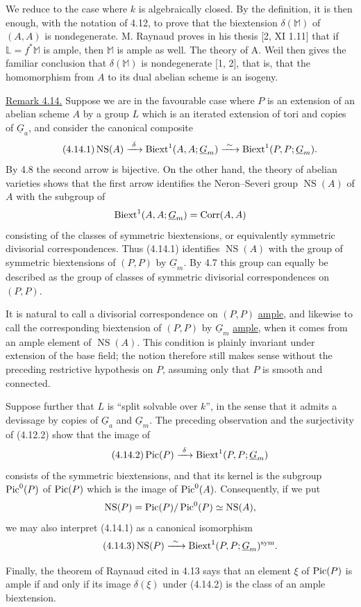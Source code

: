 We reduce to the case where $k$ is algebraically closed.  By the
definition, it is then enough, with the notation of 4.12, to prove
that the biextension $\delta(\mathbb M)$ of $(A,A)$ is
nondegenerate.  M. Raynaud proves in his thesis [2, XI 1.11] that if
$\mathbb L=f^*\mathbb M$ is ample, then $\mathbb M$ is ample as
well.  The theory of A. Weil then gives the familiar conclusion that
$\delta(\mathbb M)$ is nondegenerate [1, 2], that is, that the
homomorphism from $A$ to its dual abelian scheme is an isogeny.

\medskip
\noindent\underline{Remark 4.14.}  Suppose we are in the favourable
case where $P$ is an extension of an abelian scheme $A$ by a group
$L$ which is an iterated extension of tori and copies of
$\underline G_a$, and consider the canonical composite
\begin{equation}\tag{4.14.1}
 \operatorname{NS}(A)
 \xrightarrow{\ \delta\ }
 \Biext^1(A,A;\underline G_m)
 \xrightarrow{\ \sim\ }
 \Biext^1(P,P;\underline G_m).
\end{equation}
By 4.8 the second arrow is bijective.  On the other hand, the theory
of abelian varieties shows that the first arrow identifies the
Neron--Severi group $\operatorname{NS}(A)$ of $A$ with the subgroup
of
\[
 \Biext^1(A,A;\underline G_m)=\operatorname{Corr}(A,A)
\]
consisting of the classes of symmetric biextensions, or equivalently
symmetric divisorial correspondences.  Thus (4.14.1) identifies
$\operatorname{NS}(A)$ with the group of symmetric biextensions of
$(P,P)$ by $\underline G_m$.  By 4.7 this group can equally be
described as the group of classes of symmetric divisorial
correspondences on $(P,P)$.

It is natural to call a divisorial correspondence on $(P,P)$
\underline{ample}, and likewise to call the corresponding
biextension of $(P,P)$ by $\underline G_m$ \underline{ample}, when
it comes from an ample element of $\operatorname{NS}(A)$.  This
condition is plainly invariant under extension of the base field;
the notion therefore still makes sense without the preceding
restrictive hypothesis on $P$, assuming only that $P$ is smooth and
connected.

Suppose further that $L$ is ``split solvable over $k$'', in the
sense that it admits a devissage by copies of $\underline G_a$ and
$\underline G_m$.  The preceding observation and the surjectivity of
(4.12.2) show that the image of
\begin{equation}\tag{4.14.2}
 \Pic(P)\xrightarrow{\ \delta\ }
 \Biext^1(P,P;\underline G_m)
\end{equation}
consists of the symmetric biextensions, and that its kernel is the
subgroup $\operatorname{Pic}^0(P)$ of $\operatorname{Pic}(P)$ which is the image of $\operatorname{Pic}^0(A)$.
Consequently, if we put
\[
 \operatorname{NS}(P)=\operatorname{Pic}(P)/\operatorname{Pic}^0(P)
 \simeq\operatorname{NS}(A),
\]
we may also interpret (4.14.1) as a canonical isomorphism
\begin{equation}\tag{4.14.3}
 \operatorname{NS}(P)
 \xrightarrow{\ \sim\ }
 \Biext^1(P,P;\underline G_m)^{\mathrm{sym}}.
\end{equation}

Finally, the theorem of Raynaud cited in 4.13 says that an element
$\xi$ of $\operatorname{Pic}(P)$ is ample if and only if its image
$\delta(\xi)$ under (4.14.2) is the class of an ample biextension.
